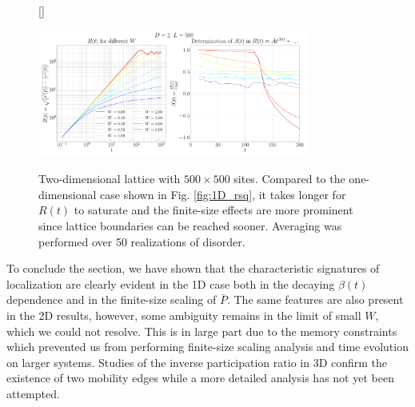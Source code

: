 \documentclass[10pt,a4paper]{article}
\begin{document}
\begin{figure}[H]
[\FBwidth]
{\caption{Two-dimensional lattice with $500\times500$ sites. Compared to the one-dimensional case shown in Fig. \ref{fig:1D_rsq}, it takes longer for $R(t)$ to saturate and the finite-size effects are more prominent since lattice boundaries can be reached sooner. Averaging was performed over 50 realizations of disorder.}\label{fig:2D_rsq}}
{\includegraphics[width=0.8\textwidth]{2D_Anderson_localization_Seminar_scaling_analysis_D2_shape_500_500_r_sq_dynamics.pdf}}
\end{figure}
\noindent 
To conclude the section, we have shown that the characteristic signatures of localization are clearly evident in the 1D case both in the decaying $\beta(t)$ dependence and in the finite-size scaling of $\bar{P}$. The same features are also present in the 2D results, however, some ambiguity remains in the limit of small $W$, which we could not resolve. This is in large part due to the memory constraints which prevented us from performing finite-size scaling analysis and time evolution on larger systems. Studies of the inverse participation ratio in 3D confirm the existence of two mobility edges while a more detailed analysis has not yet been attempted.  
\end{document}
